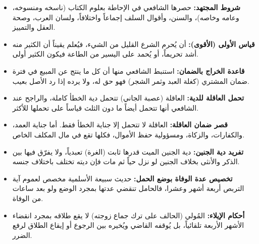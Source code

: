 \begin{itemize}
    \item \textbf{شروط المجتهد:} حصرها الشافعي في الإحاطة بعلوم الكتاب (ناسخه ومنسوخه، وعامه وخاصه)، والسنن، وأقوال السلف إجماعاً واختلافاً، ولسان العرب، وصحة العقل والتمييز.
    \item \textbf{قياس الأولى (الأقوى):} أن يُحرم الشرع القليل من الشيء، فيُعلم يقيناً أن الكثير منه أشد تحريماً، أو يُحمد على اليسير من الطاعة فيكون الكثير أولى.
    \item \textbf{قاعدة الخراج بالضمان:} استنبط الشافعي منها أن كل ما ينتج عن المبيع في فترة ضمان المشتري (كغلة العبد وثمر الشجر) فهو حق له، ولا يرده إذا رد الأصل بعيب.
    \item \textbf{تحمل العاقلة للدية:} العاقلة (عصبة الجاني) تتحمل دية الخطأ كاملة، والراجح عند الشافعي أنها تتحمل أيضاً ما دون الثلث قياساً على تحملها للأكثر.
    \item \textbf{قصر ضمان العاقلة:} العاقلة لا تتحمل إلا جناية الخطأ فقط. أما جناية العمد، والكفارات، والزكاة، ومسؤولية حفظ الأموال، فكلها تقع في مال المكلف الخاص.
    \item \textbf{تفريد دية الجنين:} دية الجنين الميت قدرها ثابت (الغرة) تعبدياً، ولا يفرّق فيها بين الذكر والأنثى بخلاف الجنين لو نزل حياً ثم مات فإن ديته تختلف باختلاف جنسه.
    \item \textbf{تخصيص عدة الوفاة بوضع الحمل:} حديث سبيعة الأسلمية مخصص لعموم آية التربص أربعة أشهر وعشرا، فالحامل تنقضي عدتها بمجرد الوضع ولو بعد ساعات من الوفاة.
    \item \textbf{أحكام الإيلاء:} المُولي (الحالف على ترك جماع زوجته) لا يقع طلاقه بمجرد انقضاء الأشهر الأربعة تلقائياً، بل يُوقفه القاضي ويُخيره بين الرجوع أو إيقاع الطلاق لرفع الضرر.
\end{itemize}